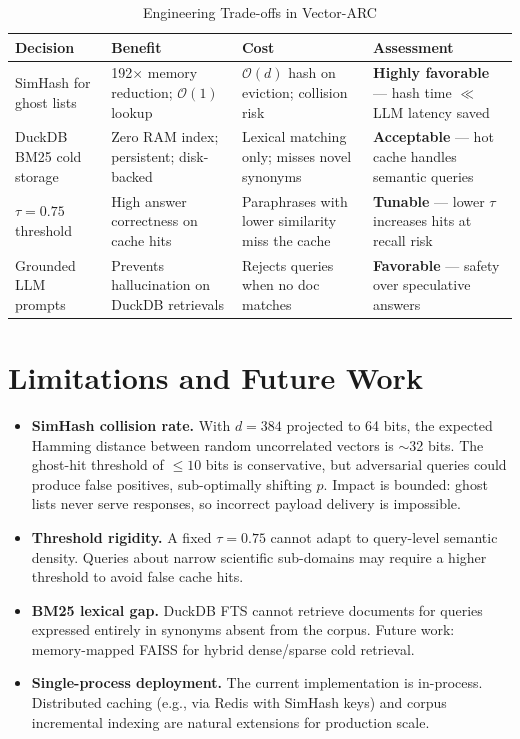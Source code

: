 \documentclass[conference,10pt]{IEEEtran}
\begin{document}
\begin{table}[t]
\centering
\caption{Engineering Trade-offs in Vector-ARC}
\label{tab:tradeoffs}
\begin{tabularx}{\textwidth}{@{}lXXX@{}}
\toprule
\textbf{Decision} & \textbf{Benefit} & \textbf{Cost} & \textbf{Assessment} \\ \midrule
SimHash for ghost lists & 192$\times$ memory reduction; $\mathcal{O}(1)$ lookup & $\mathcal{O}(d)$ hash on eviction; collision risk & \textbf{Highly favorable} — hash time $\ll$ LLM latency saved \\
DuckDB BM25 cold storage & Zero RAM index; persistent; disk-backed & Lexical matching only; misses novel synonyms & \textbf{Acceptable} — hot cache handles semantic queries \\
$\tau=0.75$ threshold & High answer correctness on cache hits & Paraphrases with lower similarity miss the cache & \textbf{Tunable} — lower $\tau$ increases hits at recall risk \\
Grounded LLM prompts & Prevents hallucination on DuckDB retrievals & Rejects queries when no doc matches & \textbf{Favorable} — safety over speculative answers \\
\bottomrule
\end{tabularx}
\end{table}

\section{Limitations and Future Work}

\begin{itemize}
  \item \textbf{SimHash collision rate.} With $d=384$ projected to 64 bits, the expected Hamming distance between random uncorrelated vectors is $\sim$32 bits. The ghost-hit threshold of $\le 10$ bits is conservative, but adversarial queries could produce false positives, sub-optimally shifting $p$. Impact is bounded: ghost lists never serve responses, so incorrect payload delivery is impossible.
  \item \textbf{Threshold rigidity.} A fixed $\tau = 0.75$ cannot adapt to query-level semantic density. Queries about narrow scientific sub-domains may require a higher threshold to avoid false cache hits.
  \item \textbf{BM25 lexical gap.} DuckDB FTS cannot retrieve documents for queries expressed entirely in synonyms absent from the corpus. Future work: memory-mapped FAISS for hybrid dense/sparse cold retrieval.
  \item \textbf{Single-process deployment.} The current implementation is in-process. Distributed caching (e.g., via Redis with SimHash keys) and corpus incremental indexing are natural extensions for production scale.
\end{itemize}
\end{document}
